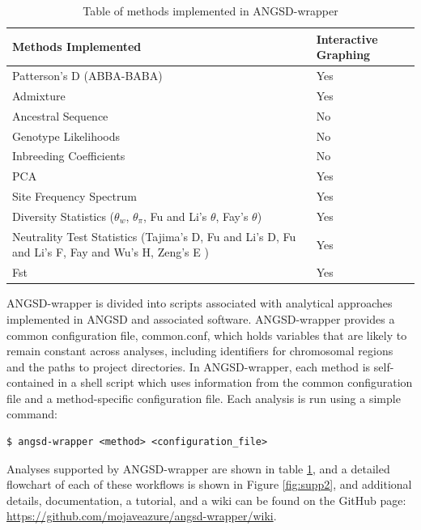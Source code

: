 \documentclass[10pt,a4paper]{article}
\newcommand{\jri}[1]{\todo[size=\scriptsize, color=flame]{#1}}
\begin{document}
\begin{table}
\begin{center}
    \begin{tabular}{ | p{5cm} | p{5cm} |}
    \hline
    \textbf{Methods Implemented} & \textbf{Interactive Graphing} \\ \hline \hline
    Patterson's D (ABBA-BABA) & Yes \\ \hline
    Admixture & Yes  \\ \hline
    Ancestral Sequence & No \\ \hline
    Genotype Likelihoods & No \\ \hline
    Inbreeding Coefficients & No \\ \hline
    PCA & Yes \\ \hline
    Site Frequency Spectrum & Yes \\ \hline
    Diversity Statistics ($\theta_w$, $\theta_\pi$, Fu and Li's $\theta$, Fay's $\theta$)   & Yes \\ \hline
    Neutrality Test Statistics (Tajima's D, Fu and Li's D, Fu and Li's F,  Fay and Wu's H, Zeng's E ) & Yes \\ \hline
    Fst & Yes \\ \hline
    \end{tabular}
    \caption{Table of methods implemented in ANGSD-wrapper}
    \label{tab:methods}
    \end{center}
\end{table}

ANGSD-wrapper is divided into scripts associated with analytical approaches implemented in ANGSD and associated software. 
ANGSD-wrapper provides a common configuration file, common.conf, which  holds variables that are likely to remain constant across analyses, including identifiers for chromosomal regions and the paths to project directories.
In ANGSD-wrapper, each method is self-contained in a shell script which uses information from the common configuration file and a method-specific configuration file. 
Each analysis is run using a simple command:

\begin{lstlisting}
$ angsd-wrapper <method> <configuration_file>
\end{lstlisting}

Analyses supported by ANGSD-wrapper are shown in table \ref{tab:methods}, and a detailed flowchart of each of these workflows is shown in Figure \ref{fig:supp2}, and additional details, documentation, a tutorial, and a wiki can be found on the GitHub page: \url{https://github.com/mojaveazure/angsd-wrapper/wiki}.
\end{document}
